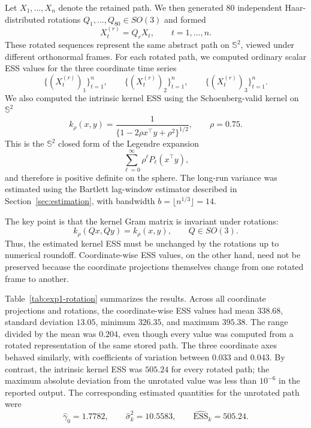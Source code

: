 \documentclass[11pt]{article}
\newcommand{\bbS}{\mathbb{S}}
\newcommand{\1}{\mathbf{1}}
\begin{document}
Let \(X_1,\ldots,X_n\) denote the retained path.  We then generated \(80\) independent Haar-distributed rotations \(Q_1,\ldots,Q_{80}\in SO(3)\) and formed
\[
    X_t^{(r)} = Q_r X_t,\qquad t=1,\ldots,n.
\]
These rotated sequences represent the same abstract path on $\bbS^2$, viewed under different orthonormal frames.  For each rotated path, we computed ordinary scalar ESS values for the three coordinate time series
\[
    \{(X_t^{(r)})_1\}_{t=1}^n,\qquad
    \{(X_t^{(r)})_2\}_{t=1}^n,\qquad
    \{(X_t^{(r)})_3\}_{t=1}^n.
\]
We also computed the intrinsic kernel ESS using the Schoenberg-valid kernel on \(\bbS^2\)
\[
    k_\rho(x,y)
    =
    \frac{1}{\{1-2\rho x^\top y+\rho^2\}^{1/2}},
    \qquad \rho=0.75.
\]
This is the \(\bbS^2\) closed form of the Legendre expansion
\[
    \sum_{\ell=0}^\infty \rho^\ell P_\ell(x^\top y),
\]
and therefore is positive definite on the sphere.  The long-run variance was estimated using the Bartlett lag-window estimator described in Section~\ref{sec:estimation}, with bandwidth \(b=\lfloor n^{1/3}\rfloor=14\).

The key point is that the kernel Gram matrix is invariant under rotations:
\[
    k_\rho(Qx,Qy)=k_\rho(x,y),\qquad Q\in SO(3).
\]
Thus, the estimated kernel ESS must be unchanged by the rotations up to numerical roundoff.  Coordinate-wise ESS values, on the other hand, need not be preserved because the coordinate projections themselves change from one rotated frame to another.

Table~\ref{tab:exp1-rotation} summarizes the results.  Across all coordinate projections and rotations, the coordinate-wise ESS values had mean \(338.68\), standard deviation \(13.05\), minimum \(326.35\), and maximum \(395.38\).  The range divided by the mean was \(0.204\), even though every value was computed from a rotated representation of the same stored path.  The three coordinate axes behaved similarly, with coefficients of variation between \(0.033\) and \(0.043\).  By contrast, the intrinsic kernel ESS was \(505.24\) for every rotated path; the maximum absolute deviation from the unrotated value was less than \(10^{-6}\) in the reported output.  The corresponding estimated quantities for the unrotated path were
\[
    \widehat\gamma_0 = 1.7782,
    \qquad
    \widehat\sigma_k^2 = 10.5583,
    \qquad
    \widehat{\mathrm{ESS}}_k = 505.24 .
\]
\end{document}
